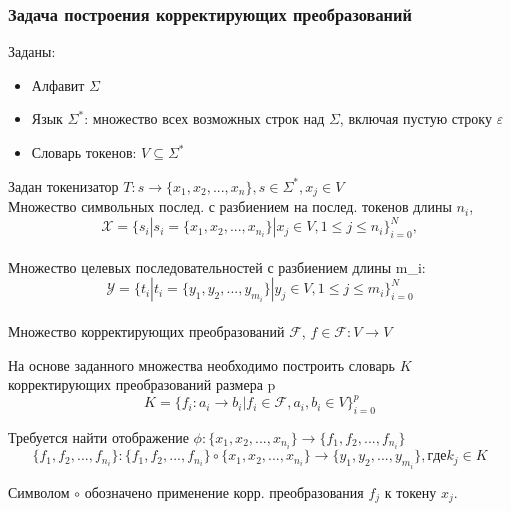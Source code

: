 \documentclass[10pt]{beamer}
\begin{document}
\begin{frame}
\frametitle{Задача построения корректирующих преобразований}
\justifying
\begin{small}
Заданы: 
\begin{itemize}
\item Алфавит \( \Sigma \) 
\item Язык \( \Sigma^* \): множество всех возможных строк над \(\Sigma\), включая пустую строку \(\varepsilon\) 
\item Словарь токенов: \( V \subseteq \Sigma^* \)
\end{itemize}
Задан токенизатор $ T: s \to \{x_1, x_2, ..., x_n\}, s \in \Sigma^*, x_j \in V$ \\
 Множество символьных послед. с разбиением на послед. токенов длины $n_i$, \[ \mathcal{X} = \{s_i | s_i=\{x_1, x_2, ... , x_{n_i}\} | x_j \in V, 1 \le j \le n_i\}_{i = 0}^N, \] \\
Множество целевых последовательностей с разбиением длины m_i:
\\\[\mathcal{Y} = \{t_i | t_i =\{y_1, y_2, ... , y_{m_i}\} | y_j \in V, 1 \le j \le m_i\}_{i = 0}^N \] \\

Множество корректирующих преобразований \( \mathcal{F} \), \(f \in \mathcal{F}: V \to V \)

На основе заданного множества необходимо построить словарь $ K $ корректирующих преобразований размера p  \[ K = \{f_i: a_i \to b_i | f_i \in \mathcal{F}, a_i, b_i \in V\}_{i = 0}^{p} \]


Требуется найти отображение $\phi : \{x_1, x_2, ..., x_{n_i}\} \to  \{f_1, f_2, ..., f_{n_i}\}$ 
\[ \{f_1, f_2, ..., f_{n_i}\}: \{f_1, f_2, ..., f_{n_i}\} \circ \{x_1, x_2, ..., x_{n_i}\} \rightarrow \{y_1, y_2, ..., y_{m_i}\}, где k_j \in K \]

Символом $\circ$ обозначено применение корр. преобразования $f_j$ к токену $x_j$.

\end{small}
\end{frame}
\end{document}
